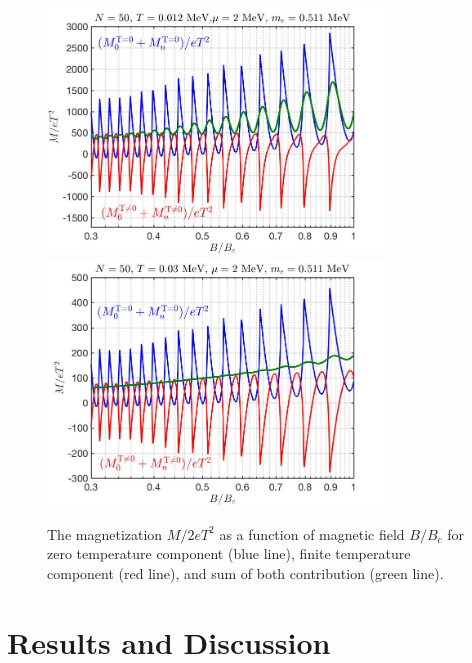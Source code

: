\documentclass[sn-mathphys,Numbered]{sn-jnl}
\begin{document}
\begin{figure}[ht]
\centering
\includegraphics[width=0.8\textwidth]{./plot/Magnetization_cold_corr}
\includegraphics[width=0.8\textwidth]{./plot/Magnetization_cold_corr003}
\caption{The magnetization $M/2eT^2$ as a function of magnetic field $B/B_c$ for zero temperature component (blue line), finite temperature component (red line), and sum of both contribution (green line). }
\label{M_MagneticField002}
\end{figure}

\section{Results and Discussion}
\label{sec12}

\end{document}
